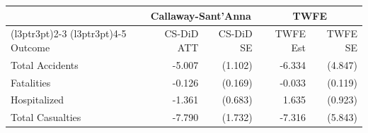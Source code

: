 \begin{tabular}[t]{lrrrr}
\toprule
\multicolumn{1}{c}{ } & \multicolumn{2}{c}{Callaway-Sant'Anna} & \multicolumn{2}{c}{TWFE} \\
\cmidrule(l{3pt}r{3pt}){2-3} \cmidrule(l{3pt}r{3pt}){4-5}
Outcome & CS-DiD ATT & CS-DiD SE & TWFE Est & TWFE SE\\
\midrule
Total Accidents & -5.007 & (1.102) & -6.334 & (4.847)\\
Fatalities & -0.126 & (0.169) & -0.033 & (0.119)\\
Hospitalized & -1.361 & (0.683) & 1.635 & (0.923)\\
Total Casualties & -7.790 & (1.732) & -7.316 & (5.843)\\
\bottomrule
\end{tabular}
